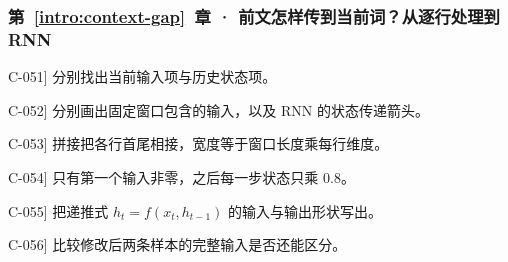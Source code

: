 \subsubsection*{第~\ref*{intro:context-gap}~章 · 前文怎样传到当前词？从逐行处理到 RNN}
\begin{answerhints}
\item[\hyperref[exercise:rnn-one-step]{C-051}] \leavevmode{}\label{hint:rnn-one-step}分别找出当前输入项与历史状态项。
\item[\hyperref[exercise:history-model-comparison]{C-052}] \leavevmode{}\label{hint:history-model-comparison}分别画出固定窗口包含的输入，以及 RNN 的状态传递箭头。
\item[\hyperref[exercise:window-input-width]{C-053}] \leavevmode{}\label{hint:window-input-width}拼接把各行首尾相接，宽度等于窗口长度乘每行维度。
\item[\hyperref[exercise:rnn-decay]{C-054}] \leavevmode{}\label{hint:rnn-decay}只有第一个输入非零，之后每一步状态只乘 $0.8$。
\item[\hyperref[exercise:rnn-state-scaling]{C-055}] \leavevmode{}\label{hint:rnn-state-scaling}把递推式 $h_t=f(x_t,h_{t-1})$ 的输入与输出形状写出。
\item[\hyperref[exercise:context-conflicting-labels]{C-056}] \leavevmode{}\label{hint:context-conflicting-labels}比较修改后两条样本的完整输入是否还能区分。
\end{answerhints}
